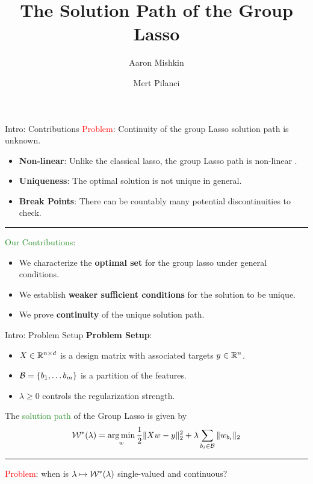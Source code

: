 \documentclass[usenames,dvipsnames,mathserif,notheorems]{beamer}
\title{The Solution Path of the Group Lasso}
\subtitle{}
\author{Aaron Mishkin \and Mert Pilanci}
\institute{Stanford University}
\date{}
\newcommand{\horizontalrule}{
	{
			\vspace{-0.5em}
			\center \rule{\textwidth}{0.1em}
			\vspace{-0.2em}
		}
}
\newcommand{\red}[1]{\textcolor{Red}{#1}}
\newcommand{\green}[1]{\textcolor{ForestGreen}{#1}}
\begin{document}
\maketitle

\begin{frame}{Intro: Contributions}
	\red{Problem}: Continuity of the group Lasso solution path is unknown.
	\pause
	\begin{itemize}
		\item \textbf{Non-linear}: Unlike the classical lasso, the group Lasso path is non-linear \citep{efron2004least}.
		      \pause
		\item \textbf{Uniqueness}: The optimal solution is not unique in general.
		      \pause
		\item \textbf{Break Points}: There can be countably many potential discontinuities to check.
	\end{itemize}
	\pause
	\horizontalrule

	\green{Our Contributions}:
	\begin{itemize}
		\pause
		\item We characterize the \textbf{optimal set} for the group lasso under general conditions.
		      \pause
		\item We establish \textbf{weaker sufficient conditions} for the solution to be unique.
		      \pause
		\item We prove \textbf{continuity} of the unique solution path.
	\end{itemize}
\end{frame}


\begin{frame}{Intro: Problem Setup}
	\textbf{Problem Setup}:
	\begin{itemize}
		\item \( X \in \mathbb{R}^{n \times d} \) is a design matrix with associated targets \( y \in \mathbb{R}^n \).
		\item \( \mathcal{B} = \left\{b_1, \ldots b_m\right\} \) is a partition of the features.
		\item \( \lambda \geq 0 \) controls the regularization strength.
	\end{itemize}

	\vspace{0.5em}
	\pause

	The \green{solution path} of the Group Lasso is given by
	\[
		\mathcal{W}^*(\lambda) = \mathop{\rm arg\,min}_{w} \frac 1 2 \|X w - y\|_2^2 + \lambda \sum_{{b_i} \in \mathcal{B}} \|w_{b_i}\|_2
	\]

	\horizontalrule
	\pause

	\red{Problem}: when is \( \lambda \mapsto \mathcal{W}^*(\lambda) \) single-valued and continuous?

\end{frame}
\end{document}

